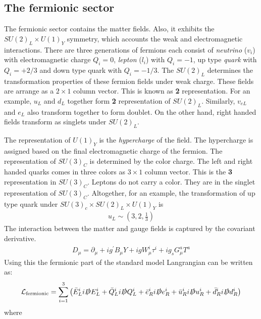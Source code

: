 \subsection{The fermionic sector}
The fermionic sector contains the matter fields. Also, it exhibits the $SU(2)_L\times U(1)_Y$ symmetry, which accounts the weak and electromagnetic  interactions. There are three generations of fermions each consist of \textit{neutrino} ($v_i$) with electromagnetic charge $Q_i=0$, \textit{lepton} ($l_i$) with $Q_i=-1$, up type \textit{quark} with $Q_i=+2/3$ and down type quark with $Q_i=-1/3$. The $SU(2)_L$ determines the transformation properties of these fermion fields under weak charge. These fields are arrange as a $2\times 1$ column vector. This is known as \textbf{2} representation. For an example, $u_L$ and $d_L$ together form \textbf{2} representation of $SU(2)_L$. Similarly, $v_{eL}$ and $e_L$ also transform together to form doublet. On the other hand, right handed fields transform as singlets under $SU(2)_L$.\par
The representation of $U(1)_Y$ is the \textit{hypercharge} of the field. The hypercharge is assigned based on the final electromagnetic charge of the fermion. The representation of $SU(3)_C$ is determined by the color charge. The left and right handed quarks comes in three colors as $3\times 1$ column vector. This is the \textbf{3} representation in $SU(3)_C$. Leptons do not carry a color. They are in the singlet representation of $SU(3)_C$.
Altogether, for an example, the transformation of up type quark under $SU(3)_c\times SU(2)_L\times U(1)_Y$ is
\begin{eqnarray}
u_L\sim (3,2,\frac{1}{3})
\end{eqnarray}
The interaction between the matter and gauge fields is captured by the covariant derivative.
\begin{eqnarray}
D_{\mu}=\partial_{\mu}+i g^{\prime} B_{\mu} Y+i g W_{\mu}^{i} \tau^{i}+i g_{s} G_{\mu}^{a} T^{a}
\end{eqnarray} 
Using this the fermionic part of the standard model Langrangian can be written as:
\begin{eqnarray}
\mathcal{L}_{\text{fermionic}}=\sum_{i=1}^{3}\left(\bar{E}^i_L i \slashed{D}E_{L}^i+\bar{Q}_{L}^i i\slashed{D}Q_L^i+\bar{e}_R^i i\slashed{D}e_{R}^i+\bar{u}_R^i i\slashed{D}u_R^i+\bar{d}_R^i i\slashed{D}d_R^i\right)
\end{eqnarray}
where 
